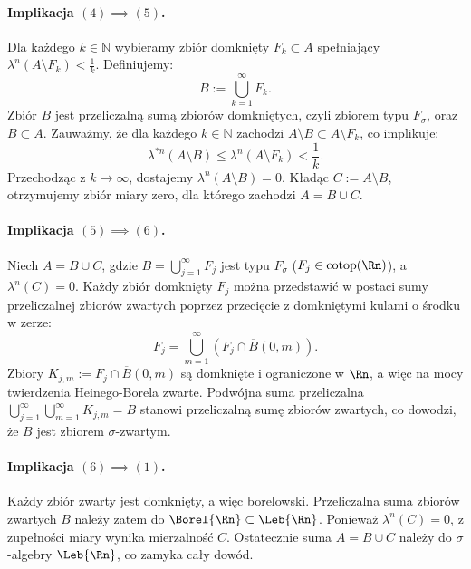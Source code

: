 \begin{dow}
    \paragraph{Implikacja $(4) \implies (5)$.}
    Dla każdego $k \in \mathbb{N}$ wybieramy zbiór domknięty $F_k \subset A$ spełniający $\lambda^n(A \setminus F_k) < \frac{1}{k}$.
    Definiujemy:
    \begin{equation*}
        B := \bigcup_{k=1}^\infty F_k.
    \end{equation*}
    Zbiór $B$ jest przeliczalną sumą zbiorów domkniętych, czyli zbiorem typu $F_\sigma$, oraz $B \subset A$. Zauważmy, że dla każdego $k \in \mathbb{N}$ zachodzi $A \setminus B \subset A \setminus F_k$, co implikuje:
    \begin{equation*}
        \lambda^{*n}(A \setminus B) \le \lambda^n(A \setminus F_k) < \frac{1}{k}.
    \end{equation*}
    Przechodząc z $k \to \infty$, dostajemy $\lambda^n(A \setminus B) = 0$. Kładąc $C := A \setminus B$, otrzymujemy zbiór miary zero, dla którego zachodzi $A = B \cup C$.

    \paragraph{Implikacja $(5) \implies (6)$.}
    Niech $A = B \cup C$, gdzie $B = \bigcup_{j=1}^\infty F_j$ jest typu $F_\sigma$ ($F_j \in \mathrm{cotop}(\Rn)$), a $\lambda^n(C) = 0$.
    Każdy zbiór domknięty $F_j$ można przedstawić w postaci sumy przeliczalnej zbiorów zwartych poprzez przecięcie z domkniętymi kulami o środku w zerze:
    \begin{equation*}
        F_j = \bigcup_{m=1}^\infty \left( F_j \cap \overline{B}(0, m) \right).
    \end{equation*}
    Zbiory $K_{j, m} := F_j \cap \overline{B}(0, m)$ są domknięte i ograniczone w $\Rn$, a więc na mocy twierdzenia Heinego-Borela zwarte. Podwójna suma przeliczalna $\bigcup_{j=1}^\infty \bigcup_{m=1}^\infty K_{j, m} = B$ stanowi przeliczalną sumę zbiorów zwartych, co dowodzi, że $B$ jest zbiorem $\sigma$-zwartym.

    \paragraph{Implikacja $(6) \implies (1)$.}
    Każdy zbiór zwarty jest domknięty, a więc borelowski. Przeliczalna suma zbiorów zwartych $B$ należy zatem do $\Borel{\Rn} \subset \Leb{\Rn}$. Ponieważ $\lambda^n(C) = 0$, z zupełności miary wynika mierzalność $C$. Ostatecznie suma $A = B \cup C$ należy do $\sigma$-algebry $\Leb{\Rn}$, co zamyka cały dowód.
\end{dow}

